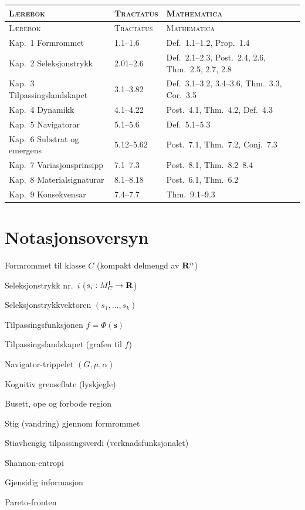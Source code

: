 \medskip
\begin{small}
\begin{longtable}{@{}p{38mm}p{20mm}p{25mm}@{}}
\toprule
\textsc{L\ae rebok} & \textsc{Tractatus} & \textsc{Mathematica} \\
\midrule
\endfirsthead
\toprule
\textsc{L\ae rebok} & \textsc{Tractatus} & \textsc{Mathematica} \\
\midrule
\endhead
\bottomrule
\endfoot
Kap.~1 Formrommet   & 1.1--1.6  & Def.~1.1--1.2, Prop.~1.4 \\
Kap.~2 Seleksjonstrykk & 2.01--2.6 & Def.~2.1--2.3, Post.~2.4, 2.6, Thm.~2.5, 2.7, 2.8 \\
Kap.~3 Tilpassingslandskapet & 3.1--3.82 & Def.~3.1--3.2, 3.4--3.6, Thm.~3.3, Cor.~3.5 \\
Kap.~4 Dynamikk     & 4.1--4.22 & Post.~4.1, Thm.~4.2, Def.~4.3 \\
Kap.~5 Navigatorar  & 5.1--5.6  & Def.~5.1--5.3 \\
Kap.~6 Substrat og emergens & 5.12--5.62 & Post.~7.1, Thm.~7.2, Conj.~7.3 \\
Kap.~7 Variasjonsprinsipp & 7.1--7.3 & Post.~8.1, Thm.~8.2--8.4 \\
Kap.~8 Materialsignaturar & 8.1--8.18 & Post.~6.1, Thm.~6.2 \\
Kap.~9 Konsekvensar & 7.4--7.7  & Thm.~9.1--9.3 \\
\end{longtable}
\end{small}


\chapter{Notasjonsoversyn}

\begin{description}[style=nextline, leftmargin=2em]
  \item[$\MC$] Formrommet til klasse $C$ (kompakt delmengd av $\mathbf{R}^n$)
  \item[$s_i$] Seleksjonstrykk nr.~$i$ ($s_i : M^{\mathsf{I}}_C \to \mathbf{R}$)
  \item[$\bm{s}$] Seleksjonstrykkvektoren $(s_1, \ldots, s_k)$
  \item[$f$] Tilpassingsfunksjonen $f = \Phi(\bm{s})$
  \item[$\FitLand$] Tilpassingslandskapet (grafen til $f$)
  \item[$\Nav$] Navigator-trippelet $(G, \mu, \alpha)$
  \item[$\CogBound$] Kognitiv grenseflate (lyskjegle)
  \item[$B, O, F$] Busett, ope og forbode region
  \item[$\gamma$] Stig (vandring) gjennom formrommet
  \item[{$S[\gamma]$}] Stiavhengig tilpassingsverdi (verknadsfunksjonalet)
  \item[$\Ent$] Shannon-entropi
  \item[$\MI$] Gjensidig informasjon
  \item[$\Pareto$] Pareto-fronten
\end{description}
